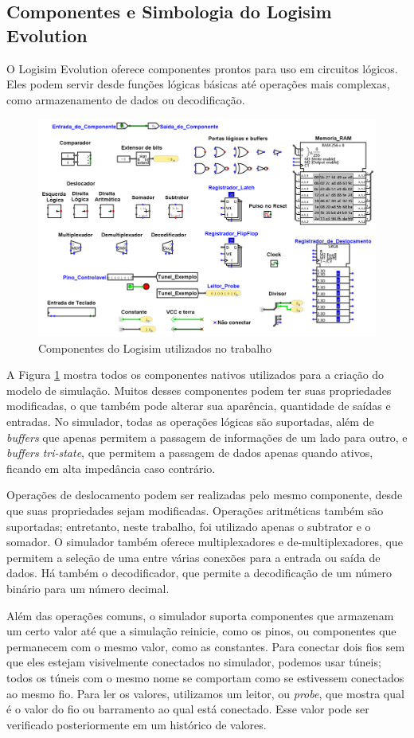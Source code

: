 \documentclass[
	article,			%
	11pt,				%
	oneside,			%
	a4paper,			%
	english,			%
	brazil,				%
	sumario=tradicional
	]{abntex2}
\begin{document}
\subsection{Componentes e Simbologia do Logisim Evolution}

O Logisim Evolution oferece componentes prontos para uso em circuitos lógicos. Eles podem servir desde funções lógicas básicas até operações mais complexas, como armazenamento de dados ou decodificação.
\begin{figure}[H]
    \centering
    \includegraphics[width=0.75\linewidth]{Logisim/LogisimSimbologia.png}
    \caption{Componentes do Logisim utilizados no trabalho}
    \label{fig:logisimComponents}
\end{figure}

A Figura \ref{fig:logisimComponents} mostra todos os componentes nativos utilizados para a criação do modelo de simulação. Muitos desses componentes podem ter suas propriedades modificadas, o que também pode alterar sua aparência, quantidade de saídas e entradas. No simulador, todas as operações lógicas são suportadas, além de \textit{buffers} que apenas permitem a passagem de informações de um lado para outro, e \textit{buffers tri-state}, que permitem a passagem de dados apenas quando ativos, ficando em alta impedância caso contrário.

Operações de deslocamento podem ser realizadas pelo mesmo componente, desde que suas propriedades sejam modificadas. Operações aritméticas também são suportadas; entretanto, neste trabalho, foi utilizado apenas o subtrator e o somador. O simulador também oferece multiplexadores e de-multiplexadores, que permitem a seleção de uma entre várias conexões para a entrada ou saída de dados. Há também o decodificador, que permite a decodificação de um número binário para um número decimal.

Além das operações comuns, o simulador suporta componentes que armazenam um certo valor até que a simulação reinicie, como os pinos, ou componentes que permanecem com o mesmo valor, como as constantes. Para conectar dois fios sem que eles estejam visivelmente conectados no simulador, podemos usar túneis; todos os túneis com o mesmo nome se comportam como se estivessem conectados ao mesmo fio. Para ler os valores, utilizamos um leitor, ou \textit{probe}, que mostra qual é o valor do fio ou barramento ao qual está conectado. Esse valor pode ser verificado posteriormente em um histórico de valores.
\end{document}
